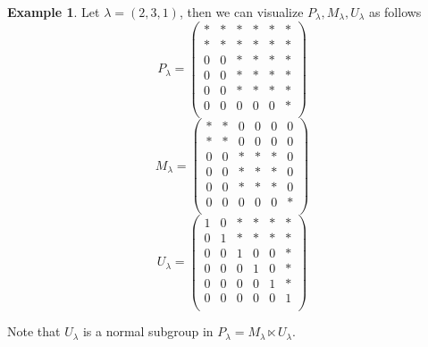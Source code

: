 \documentclass[12pt,reqno]{amsart}
\theoremstyle{definition}
\newtheorem{ex}[thm]{Example}
\theoremstyle{remark}
\numberwithin{equation}{section}
\begin{document}
\begin{ex}\label{PLU_examples}
    Let $\lambda=(2,3,1)$, then we can visualize $P_{\lambda},M_{\lambda},U_{\lambda}$ as follows
    \begin{equation*}
        P_{\lambda}=
        \begin{pmatrix}
            * & * & * & * & * & *\\
            * & * & * & * & * & *\\
            0 & 0 & * & * & * & *\\
            0 & 0 & * & * & * & *\\
            0 & 0 & * & * & * & *\\
            0 & 0 & 0 & 0 & 0 & *\\
        \end{pmatrix}
    \end{equation*}
    \begin{equation*}
        M_{\lambda}=
        \begin{pmatrix}
            * & * & 0 & 0 & 0 & 0\\
            * & * & 0 & 0 & 0 & 0\\
            0 & 0 & * & * & * & 0\\
            0 & 0 & * & * & * & 0\\
            0 & 0 & * & * & * & 0\\
            0 & 0 & 0 & 0 & 0 & *\\
        \end{pmatrix}
    \end{equation*}
    \begin{equation*}
        U_{\lambda}=
        \begin{pmatrix}
            1 & 0 & * & * & * & *\\
            0 & 1 & * & * & * & *\\
            0 & 0 & 1 & 0 & 0 & *\\
            0 & 0 & 0 & 1 & 0 & *\\
            0 & 0 & 0 & 0 & 1 & *\\
            0 & 0 & 0 & 0 & 0 & 1\\
        \end{pmatrix}
    \end{equation*}
\end{ex}

Note that $U_{\lambda}$ is a normal subgroup in $P_{\lambda}=M_{\lambda}\ltimes U_{\lambda}$.\\
\end{document}
